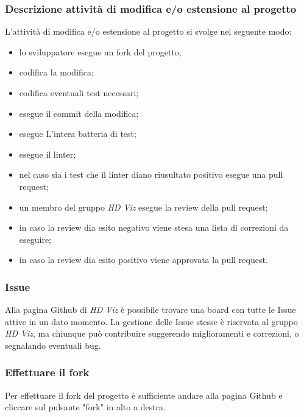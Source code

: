         \subsubsection{Descrizione attività di modifica e/o estensione al progetto}
        L'attività di modifica e/o estensione al progetto si svolge nel seguente modo:
        \begin{itemize}
            \item lo sviluppatore esegue un fork del progetto;
            \item codifica la modifica;
            \item codifica eventuali test necessari;
            \item esegue il commit della modifica;
            \item esegue L'intera batteria di test;
            \item esegue il linter;
            \item nel caso sia i test che il linter diano riusultato positivo esegue una pull request;
            \item un membro del gruppo \textit{HD Viz} esegue la review della pull request;
            \item in caso la review dia esito negativo viene stesa una lista di correzioni da eseguire;
            \item in caso la review dia esito positivo viene approvata la pull request.
        \end{itemize}
        \subsubsection{Issue}
        Alla pagina Github di \textit{HD Viz} è possibile trovare una board con tutte le Issue attive in un dato momento. La gestione delle Issue stesse è riservata al gruppo \textit{HD Viz}, ma chiunque può contribuire suggerendo miglioramenti e correzioni, o segnalando eventuali bug. 
        \subsubsection{Effettuare il fork}
        Per effettuare il fork del progetto è sufficiente andare alla pagina Github e cliccare sul pulsante "fork" in alto a destra.
